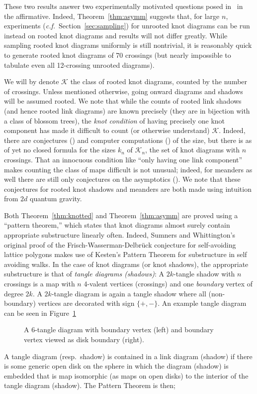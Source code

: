 \documentclass[submission%
]{dmtcs}
\newcommand{\KnotDiaClass}{\mathscr{K}}
\newcommand{\KnotDiaCard}{k}
\begin{document}
These two results answer two experimentally motivated questions posed
in~\cite{CCMknotdiagrams2015} in the affirmative. Indeed,
Theorem~\ref{thm:asymm} suggests that, for large $n$, experiments
(\textit{c.f.}\ Section~\ref{sec:sampling}) for unrooted knot diagrams
can be run instead on rooted knot diagrams and results will not differ
greatly. While sampling rooted knot diagrams uniformly is still
nontrivial, it is reasonably quick to generate rooted knot diagrams of
70 crossings (but nearly impossible to tabulate even all 12-crossing
unrooted diagrams).

We will by denote $\KnotDiaClass$ the class of rooted knot diagrams,
counted by the number of crossings. Unless mentioned otherwise, going
onward diagrams and shadows will be assumed rooted. We note that while
the counts of rooted link shadows (and hence rooted link diagrams) are
known precisely (they are in bijection with a class of blossom trees),
the \emph{knot condition} of having precisely one knot component has
made it difficult to count (or otherwise understand)
$\KnotDiaClass$. Indeed, there are
conjectures (\cite{pzjschaeff2004planecurveasymp}) and computer
computations
(\cite{zuber2015mapsimsperms,pzjtransfermtx,pzjmtxintchap}) of the
size, but there is as of yet no closed formula for the sizes
$\KnotDiaCard_n$ of $\KnotDiaClass_n$, the set of knot diagrams with
$n$ crossings. That an innocuous condition like ``only having one link
component'' makes counting the class of maps difficult is not unusual;
indeed, for meanders as well there are still only conjectures on the
asymptotics (\cite{DiFrancesco2000699}). We note that these conjectures
for rooted knot shadows and meanders are both made using intuition
from $2d$ quantum gravity.

Both Theorem~\ref{thm:knotted} and Theorem~\ref{thm:asymm} are proved
using a ``pattern theorem,'' which states that knot diagrams almost
surely contain appropriate substructure linearly often. Indeed,
Sumners and Whittington's original proof of the
Frisch-Wasserman-Delbr\"uck conjecture for self-avoiding lattice
polygons makes use of Kesten's Pattern Theorem for substructure in
self avoiding walks. In the case of knot diagrams (or knot shadows),
the appropriate substructure is that of \emph{tangle diagrams
  (shadows)}: A $2k$-tangle shadow with $n$ crossings is a map with
$n$ 4-valent vertices (crossings) and one \emph{boundary} vertex of
degree $2k$. A $2k$-tangle diagram is again a tangle shadow where all
(non-boundary) vertices are decorated with sign $\{+,-\}$. An example
tangle diagram can be seen in Figure~\ref{fig:tangleex}
\begin{figure}[hbtp]
  \centering
  \subfigure{}\hfil
  \subfigure{}
  \caption{A 6-tangle diagram with boundary vertex (left) and boundary
    vertex viewed as disk boundary (right).}
  \label{fig:tangleex}
\end{figure}
A tangle
diagram (resp.\ shadow) is contained in a link diagram (shadow) if
there is some generic open disk on the sphere in which the diagram
(shadow) is embedded that is map isomorphic (as maps on open disks) to
the interior of the tangle diagram (shadow). The Pattern Theorem is
then;
\end{document}
